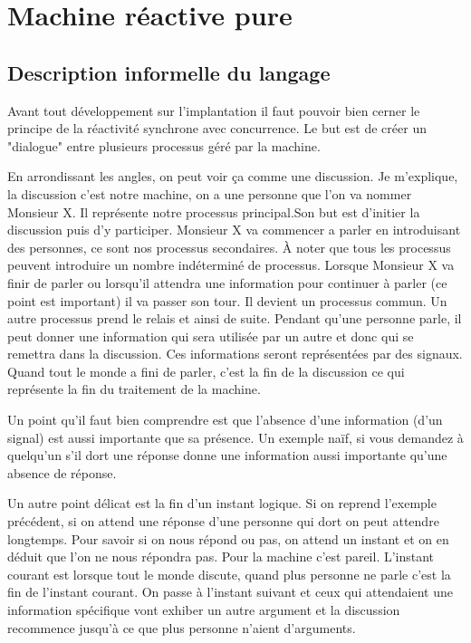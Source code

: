 \documentclass[10pt,a4paper]{report}
\begin{document}
\section{Machine réactive pure}

\subsection{Description informelle du langage}

Avant tout développement sur l'implantation il faut pouvoir bien cerner le principe de la réactivité synchrone avec concurrence. Le but est de créer un "dialogue" entre plusieurs processus géré par la machine. 
\medbreak

En arrondissant les angles, on peut voir ça comme une discussion. Je m'explique, la discussion c'est notre machine, on a une personne que l'on va nommer Monsieur X. Il représente notre processus principal.Son but est d'initier la discussion puis d'y participer.
\smallbreak 
Monsieur X va commencer a parler en introduisant des personnes, ce sont nos processus secondaires. À noter que tous les processus peuvent introduire un nombre indéterminé de processus. Lorsque Monsieur X va finir de parler ou lorsqu'il attendra une information pour continuer à parler (ce point est important) il va passer son tour. Il devient un processus commun. Un autre processus prend le relais et ainsi de suite.
\smallbreak
Pendant qu'une personne parle, il peut donner une information qui sera utilisée par un autre et donc qui se remettra dans la discussion. Ces informations seront représentées par des signaux. Quand tout le monde a fini de parler, c'est la fin de la discussion ce qui représente la fin du traitement de la machine.
\medbreak

Un point qu'il faut bien comprendre est que l'absence d'une information (d'un signal) est aussi importante que sa présence. Un exemple naïf, si vous demandez à quelqu'un s'il dort une réponse donne une information aussi importante qu'une absence de réponse.
\medbreak

Un autre point délicat est la fin d'un instant logique. Si on reprend l'exemple précédent, si on attend une réponse d'une personne qui dort on peut attendre longtemps. Pour savoir si on nous répond ou pas, on attend un instant et on en déduit que l'on ne nous répondra pas. Pour la machine c'est pareil. L'instant courant est lorsque tout le monde discute, quand plus personne ne parle c'est la fin de l'instant courant. On passe à l'instant suivant et ceux qui attendaient une information spécifique vont exhiber un autre argument et la discussion recommence jusqu'à ce que plus personne n'aient d'arguments.
\medbreak
\end{document}
